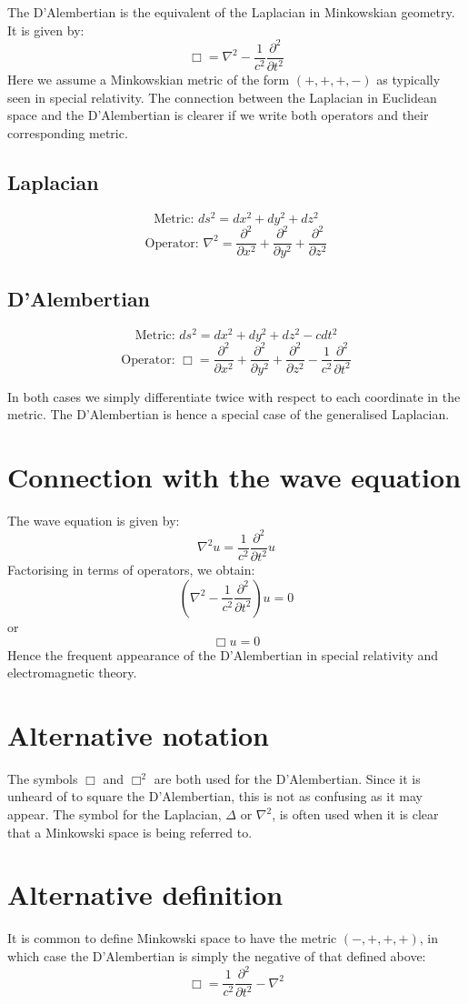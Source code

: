 \documentclass[12pt]{article}
\begin{document}
The D'Alembertian is the equivalent of the Laplacian in Minkowskian geometry. It is given by:
\[
\Box = \nabla^2 - \frac{1}{c^2} \frac{\partial^2}{\partial t^2}
\]
Here we assume a Minkowskian metric of the form $(+, +, +, -)$ as typically seen in special relativity. The connection between the Laplacian in Euclidean space and the D'Alembertian is clearer if we write both operators and their corresponding metric.
\subsection{Laplacian}
\[
\mbox{Metric: } ds^2 = dx^2 + dy^2 + dz^2
\]
\[
\mbox{Operator: } \nabla^2 = \frac{\partial^2}{\partial x^2} + \frac{\partial^2}{\partial y^2} + \frac{\partial^2}{\partial z^2}
\]
\subsection{D'Alembertian}
\[
\mbox{Metric: } ds^2 = dx^2 + dy^2 + dz^2 -cdt^2
\]
\[
\mbox{Operator: } \Box = \frac{\partial^2}{\partial x^2} + \frac{\partial^2}{\partial y^2} + \frac{\partial^2}{\partial z^2} - \frac{1}{c^2}\frac{\partial^2}{\partial t^2}
\]

In both cases we simply differentiate twice with respect to each coordinate in the metric. The D'Alembertian is hence a special case of the generalised Laplacian.
\section{Connection with the wave equation}
The wave equation is given by:
\[
\nabla^2 u = \frac{1}{c^2}\frac{\partial^2}{\partial t^2} u
\]
Factorising in terms of operators, we obtain:
\[
(\nabla^2 - \frac{1}{c^2}\frac{\partial^2}{\partial t^2})u = 0
\]
or
\[
\Box u = 0
\]
Hence the frequent appearance of the D'Alembertian in special relativity and electromagnetic theory.
\section{Alternative notation}
The symbols $\Box$ and $\Box^2$ are both used for the D'Alembertian. Since it is unheard of to square the D'Alembertian, this is not as confusing as it may appear. The symbol for the Laplacian, $\Delta$ or $\nabla^2$, is often used when it is clear that a Minkowski space is being referred to.
\section{Alternative definition}
It is common to define Minkowski space to have the metric $(-, +, +, +)$, in which case the D'Alembertian is simply the negative of that defined above:
\[
\Box = \frac{1}{c^2} \frac{\partial^2}{\partial t^2} -\nabla^2
\]
\end{document}
